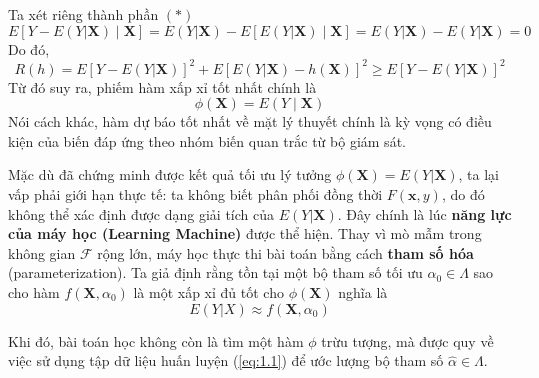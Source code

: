 Ta xét riêng thành phần $(*)$
\begin{equation*}
	E\left[ Y - E(Y|\bm{X}) \mid \bm{X} \right] = E(Y|\bm{X}) - E\left[ E(Y|\bm{X}) \mid \bm{X} \right] = E(Y|\bm{X}) - E(Y|\bm{X}) = 0
\end{equation*}
Do đó,
\begin{equation*}
	R(h) = E\left[Y - E(Y|\bm{X})\right]^2 + E\left[E(Y|\bm{X}) - h(\bm{X})\right]^2\geq E\left[Y - E(Y|\bm{X})\right]^2
\end{equation*}
Từ đó suy ra, phiếm hàm xấp xỉ tốt nhất chính là
\begin{equation*}
	\phi(\bm{X}) = E(Y \mid \bm{X})
\end{equation*}
Nói cách khác, hàm dự báo tốt nhất về mặt lý thuyết chính là kỳ vọng có điều kiện của biến đáp ứng theo nhóm biến quan trắc từ bộ giám sát.

\hspace*{0.5cm}Mặc dù đã chứng minh được kết quả tối ưu lý tưởng $\phi(\bm{X}) = E(Y|\bm{X})$, ta lại vấp phải giới hạn thực tế: ta không biết phân phối đồng thời $F(\bm{x},y)$, do đó không thể xác định được dạng giải tích của $E(Y|\bm{X})$. Đây chính là lúc \textbf{năng lực của máy học (Learning Machine)} được thể hiện. Thay vì mò mẫm trong không gian $\mathcal{F}$ rộng lớn, máy học thực thi bài toán bằng cách \textbf{tham số hóa} (parameterization). Ta giả định rằng tồn tại một bộ tham số tối ưu $\alpha_0 \in \Lambda$ sao cho hàm $f(\bm{X}, \alpha_0)$ là một xấp xỉ đủ tốt cho $\phi(\bm{X})$ nghĩa là
\begin{equation*}
	E(Y|X) \approx f(\bm{X}, \alpha_0)
\end{equation*}

Khi đó, bài toán học không còn là tìm một hàm $\phi$ trừu tượng, mà được quy về việc sử dụng tập dữ liệu huấn luyện (\ref{eq:1.1}) để ước lượng bộ tham số $\hat{\alpha} \in \Lambda$.









